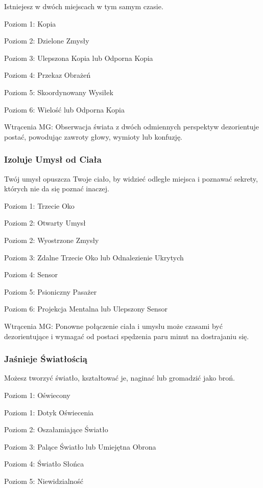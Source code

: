 Istniejesz w dwóch miejscach w tym samym czasie.

Poziom 1: Kopia

Poziom 2: Dzielone Zmysły

Poziom 3: Ulepszona Kopia lub Odporna Kopia

Poziom 4: Przekaz Obrażeń

Poziom 5: Skoordynowany Wysiłek

Poziom 6: Wielość lub Odporna Kopia

Wtrącenia MG: Obserwacja świata z dwóch odmiennych perspektyw dezorientuje postać, powodując zawroty głowy, wymioty lub konfuzję.

\subsubsection{Izoluje Umysł od Ciała}

Twój umysł opuszcza Twoje ciało, by widzieć odległe miejsca i poznawać sekrety, których nie da się poznać inaczej.

Poziom 1: Trzecie Oko

Poziom 2: Otwarty Umysł

Poziom 2: Wyostrzone Zmysły

Poziom 3: Zdalne Trzecie Oko lub Odnalezienie Ukrytych

Poziom 4: Sensor

Poziom 5: Psioniczny Pasażer

Poziom 6: Projekcja Mentalna lub Ulepszony Sensor

Wtrącenia MG: Ponowne połączenie ciała i umysłu może czasami być dezorientujące i wymagać od postaci spędzenia paru minut na dostrajaniu się. 

\subsubsection{Jaśnieje Światłością}

Możesz tworzyć światło, kształtować je, naginać lub gromadzić jako broń. 

Poziom 1: Oświecony

Poziom 1: Dotyk Oświecenia

Poziom 2: Oszałamiające Światło

Poziom 3: Palące Światło lub Umiejętna Obrona

Poziom 4: Światło Słońca 

Poziom 5: Niewidzialność

